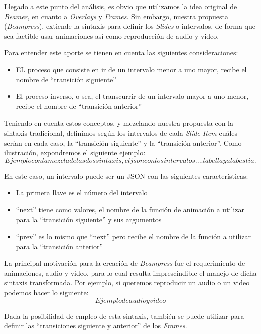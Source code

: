 	Llegado a este punto del análisis, es obvio que utilizamos la idea original de \textit{Beamer}, en cuanto a \textit{Overlays} y \textit{Frames}. Sin embargo, nuestra propuesta (\textit{Beampress}), extiende la sintaxis para definir los \textit{Slides} o intervalos, de forma que sea factible usar animaciones así como reproducción de audio y video.

	Para entender este aporte se tienen en cuenta las siguientes consideraciones:
	\begin{itemize}
		\item EL proceso que consiste en ir de un intervalo menor a uno mayor, recibe el nombre de ``transición siguiente''
		\item El proceso inverso, o sea, el transcurrir de un intervalo mayor a uno menor, recibe el nombre de ``transición anterior''
	\end{itemize}

	Teniendo en cuenta estos conceptos, y mezclando nuestra propuesta con la sintaxis tradicional, definimos según los intervalos de cada \textit{Slide Item} cuáles serían en cada caso, la ``transición siguiente'' y la ``transición anterior''. Como ilustración, expondremos el siguiente ejemplo:
	$$
	Ejemplo con la mezcla de las dos sintaxis, el json con los intervalos....la bella ya la bestia.
	$$

	En este caso, un intervalo puede ser un JSON con las siguientes características:
	\begin{itemize}
		\item La primera llave es el número del intervalo
		\item ``next'' tiene como valores, el nombre de la función de animación a utilizar para la ``transición siguiente'' y sus argumentos
		\item ``prev'' es lo mismo que ``next'' pero recibe el nombre de la función a utilizar para la ``transición anterior''
	\end{itemize}

	La principal motivación para la creación de \textit{Beampress} fue el requerimiento de animaciones, audio y video, para lo cual resulta imprescindible el manejo de dicha sintaxis transformada. Por ejemplo, si queremos reproducir un audio o un video podemos hacer lo siguiente:
	$$
	Ejemplo de audio y video
	$$

	Dada la posibilidad de empleo de esta sintaxis, también se puede utilizar para definir las ``transiciones siguiente y anterior'' de los \textit{Frames}.	





